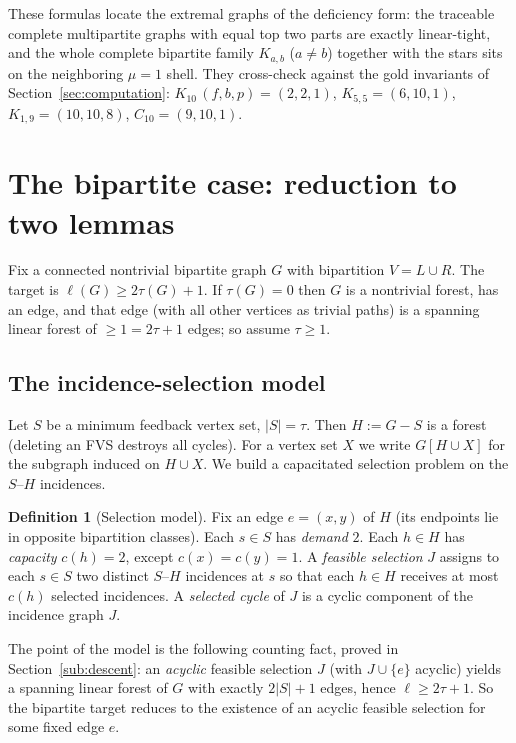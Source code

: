 \documentclass[11pt]{article}
\theoremstyle{plain}
\theoremstyle{definition}
\newtheorem{definition}[theorem]{Definition}
\newcommand{\FVS}{\tau}
\newcommand{\lf}{\ell}
\begin{document}
These formulas locate the extremal graphs of the deficiency form: the traceable
complete multipartite graphs with equal top two parts are exactly linear-tight,
and the whole complete bipartite family $K_{a,b}$ ($a\ne b$) together with the
stars sits on the neighboring $\mu=1$ shell. They cross-check against the gold
invariants of Section~\ref{sec:computation}: $K_{10}\,(f,b,p)=(2,2,1)$,
$K_{5,5}=(6,10,1)$, $K_{1,9}=(10,10,8)$, $C_{10}=(9,10,1)$.

\section{The bipartite case: reduction to two lemmas}\label{sec:bipartite}

Fix a connected nontrivial bipartite graph $G$ with bipartition $V=L\cup R$. The
target is $\lf(G)\ge2\FVS(G)+1$. If $\FVS(G)=0$ then $G$ is a nontrivial forest,
has an edge, and that edge (with all other vertices as trivial paths) is a
spanning linear forest of $\ge1=2\FVS+1$ edges; so assume $\FVS\ge1$.

\subsection{The incidence-selection model}\label{sub:model}
Let $S$ be a minimum feedback vertex set, $|S|=\FVS$. Then $H:=G-S$ is a forest
(deleting an FVS destroys all cycles). For a vertex set $X$ we write $G[H\cup X]$
for the subgraph induced on $H\cup X$. We build a capacitated selection problem
on the $S$--$H$ incidences.

\begin{definition}[Selection model]\label{def:selection}
Fix an edge $e=(x,y)$ of $H$ (its endpoints lie in opposite bipartition classes).
Each $s\in S$ has \emph{demand} $2$. Each $h\in H$ has \emph{capacity} $c(h)=2$,
except $c(x)=c(y)=1$. A \emph{feasible selection} $J$ assigns to each $s\in S$
two distinct $S$--$H$ incidences at $s$ so that each $h\in H$ receives at most
$c(h)$ selected incidences. A \emph{selected cycle} of $J$ is a cyclic component
of the incidence graph $J$.
\end{definition}

The point of the model is the following counting fact, proved in
Section~\ref{sub:descent}: an \emph{acyclic} feasible selection $J$ (with
$J\cup\{e\}$ acyclic) yields a spanning linear forest of $G$ with exactly
$2|S|+1$ edges, hence $\lf\ge2\FVS+1$. So the bipartite target reduces to the
existence of an acyclic feasible selection for some fixed edge $e$.
\end{document}
